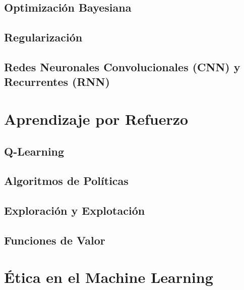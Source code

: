 \documentclass{book}
\begin{document}
\subsection{Optimización Bayesiana}
\newpage
\subsection{Regularización}
\newpage
\subsection{Redes Neuronales Convolucionales (CNN) y Recurrentes (RNN)}
\newpage
\section{Aprendizaje por Refuerzo}

\subsection{Q-Learning}
\newpage
\subsection{Algoritmos de Políticas}
\newpage
\subsection{Exploración y Explotación}
\newpage
\subsection{Funciones de Valor}
\newpage
\section{Ética en el Machine Learning}
\end{document}
